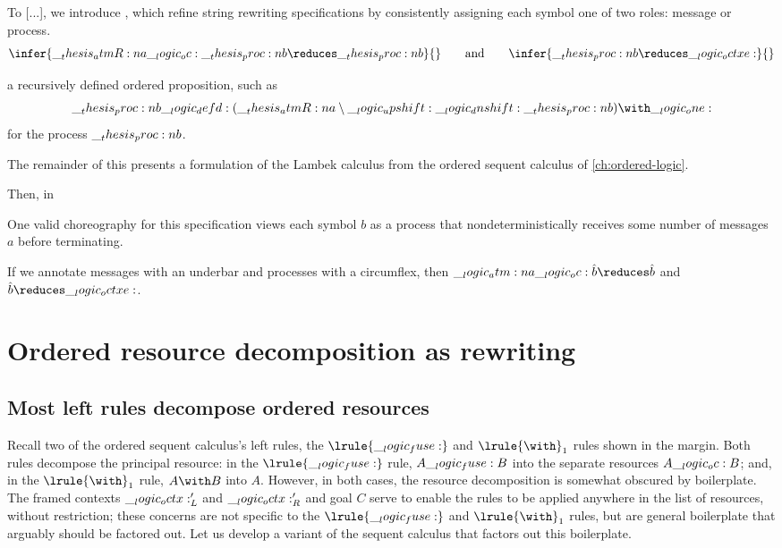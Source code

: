 To [...], we introduce , which refine string rewriting specifications by consistently assigning each symbol one of two roles: message or process.
\begin{equation*}
  \infer{\atmR{a} \oc \proc{b} \reduces \proc{b}}{}
  \qquad\text{and}\qquad
  \infer{\proc{b} \reduces \octxe}{}
\end{equation*}

a recursively defined ordered proposition, such as
\begin{equation*}
  \proc{b} \defd (\atmR{a} \limp \up \dn \proc{b}) \with \one
\end{equation*}
for the process $\__thesis_proc:n {b}$.

The remainder of this  presents a formulation of the Lambek calculus from the ordered sequent calculus of \cref{ch:ordered-logic}.

Then, in 


One valid choreography for this specification views each symbol $b$ as a process that nondeterministically receives some number of messages $a$ before terminating.

If we annotate messages with an underbar and processes with a circumflex, then $\atm{a} \oc \hat{b} \reduces \hat{b}$ and $\hat{b} \reduces \octxe$.


\section{Ordered resource decomposition as rewriting}

\subsection{Most left rules decompose ordered resources}\label{sec:ordered-rewriting:boilerplate}

Recall two of the ordered sequent calculus's left rules, the $\lrule{\fuse}$ and $\lrule{\with}_1$ rules shown in the margin.%
Both rules decompose the principal resource: in the $\lrule{\fuse}$ rule, $A \__logic_fuse: B$ into the separate resources $A \__logic_oc: B$; and, in the $\lrule{\with}_1$ rule, $A \with B$ into $A$.
However, in both cases, the resource decomposition is somewhat obscured by boilerplate.
The framed contexts $\__logic_octx:'_L$ and $\__logic_octx:'_R$ and goal $C$ serve to enable the rules to be applied anywhere in the list of resources, without restriction;
these concerns are not specific to the $\lrule{\fuse}$ and $\lrule{\with}_1$ rules, but are general boilerplate that arguably should be factored out.
Let us develop a variant of the sequent calculus that factors out this boilerplate.

